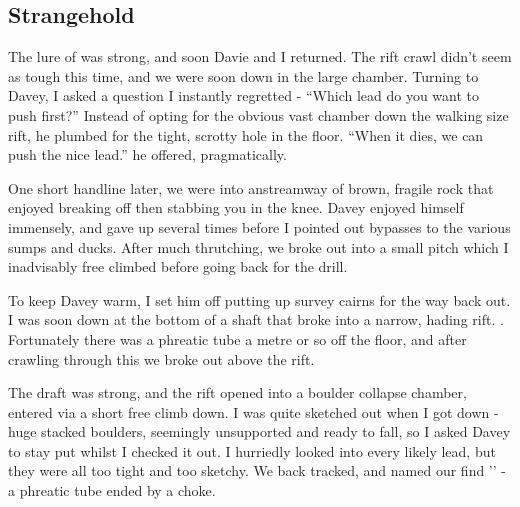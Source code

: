 \subsection{Strangehold}
The lure of  was strong, and soon Davie and I returned. The rift crawl didn’t seem as tough this time, and we were soon down in the large chamber. Turning to Davey, I asked a question I instantly regretted - “Which lead do you want to push first?” Instead of opting for the obvious vast chamber down the walking size rift, he plumbed for the tight, scrotty hole in the floor. “When it dies, we can push the nice lead.” he offered, pragmatically.

\begin{marginfigure}
\end{marginfigure}

One short handline later, we were into anstreamway of brown, fragile rock that enjoyed breaking off then stabbing you in the knee. Davey enjoyed himself immensely, and gave up several times before I pointed out bypasses to the various sumps and ducks. After much thrutching, we broke out into a small pitch which I inadvisably free climbed before going back for the drill.

To keep Davey warm, I set him off putting up survey cairns for the way back out. I was soon down at the bottom of a shaft that broke into a narrow, hading rift. . Fortunately there was a phreatic tube a metre or so off the floor, and after crawling through this we broke out above the rift.

The draft was strong, and the rift opened into a boulder collapse chamber, entered via a short free climb down. I was quite sketched out when I got down - huge stacked boulders, seemingly unsupported and ready to fall, so I asked Davey to stay put whilst I checked it out. I hurriedly looked into every likely lead, but they were all too tight and too sketchy. We back tracked, and named our find '' - a phreatic tube ended by a choke.

